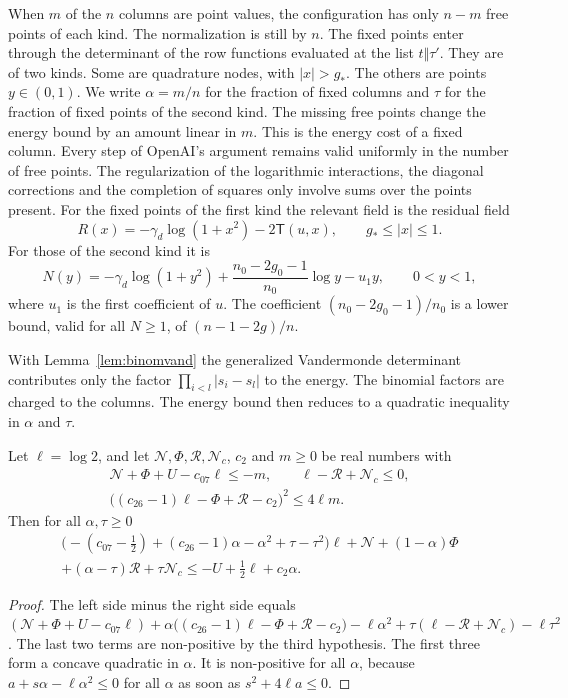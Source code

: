 When $m$ of the $n$ columns are point values, the configuration has only $n-m$ free points of each kind. The
normalization is still by $n$. The fixed points enter through the determinant of the row functions evaluated
at the list $t\Vert\tau'$. They are of two kinds. Some are quadrature nodes, with $|x|>g_*$. The others are
points $y\in(0,1)$. We write $\alpha=m/n$ for the fraction of fixed columns and $\tau$ for the fraction of
fixed points of the second kind. The missing free points change the energy bound by an amount linear in
$m$. This is the energy cost of a fixed column. Every step of OpenAI's argument remains valid uniformly in
the number of free points. The regularization of the logarithmic interactions, the diagonal corrections and
the completion of squares only involve sums over the points present. For the fixed points of the first kind
the relevant field is the residual field
\[
 R(x)=-\gamma_d\log(1+x^2)-2\mathsf T(u,x),\qquad g_*\le|x|\le1 .
\]
For those of the second kind it is
\[
 N(y)=-\gamma_d\log(1+y^2)+\frac{n_0-2g_0-1}{n_0}\log y-u_1y,\qquad0<y<1,
\]
where $u_1$ is the first coefficient of $u$. The coefficient $(n_0-2g_0-1)/n_0$ is a lower bound, valid for
all $N\ge1$, of $(n-1-2g)/n$.

With Lemma~\ref{lem:binomvand} the generalized Vandermonde determinant contributes only the factor
$\prod_{i<l}|s_i-s_l|$ to the energy. The binomial factors are charged to the columns. The energy bound then
reduces to a quadratic inequality in $\alpha$ and $\tau$.

\begin{lemma}\label{lem:budget2}
Let $\ell=\log2$, and let $\mathcal N,\Phi,\mathcal R,\mathcal N_c$, $c_2$ and $m\ge0$ be real numbers with
\begin{gather*}
 \mathcal N+\Phi+U-c_{07}\ell\le-m,\qquad \ell-\mathcal R+\mathcal N_c\le0,\\
 \bigl((c_{26}-1)\ell-\Phi+\mathcal R-c_2\bigr)^2\le4\ell m .
\end{gather*}
Then for all $\alpha,\tau\ge0$
\begin{multline*}
 \bigl(-(c_{07}-\tfrac12)+(c_{26}-1)\alpha-\alpha^2+\tau-\tau^2\bigr)\ell+\mathcal N+(1-\alpha)\Phi\\
 +(\alpha-\tau)\mathcal R+\tau\mathcal N_c\le-U+\tfrac12\ell+c_2\alpha .
\end{multline*}
\end{lemma}

\begin{proof}
The left side minus the right side equals
$(\mathcal N+\Phi+U-c_{07}\ell)+\alpha\bigl((c_{26}-1)\ell-\Phi+\mathcal R-c_2\bigr)-\ell\alpha^2
+\tau(\ell-\mathcal R+\mathcal N_c)-\ell\tau^2$. The last two terms are non-positive by the third hypothesis.
The first three form a concave quadratic in $\alpha$. It is non-positive for all $\alpha$, because
$a+s\alpha-\ell\alpha^2\le0$ for all $\alpha$ as soon as $s^2+4\ell a\le0$.
\end{proof}

